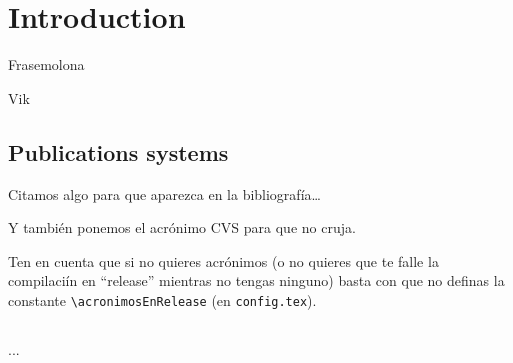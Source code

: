 %
%

\chapter{Introduction}

\begin{FraseCelebre}
\begin{Frase}
Frasemolona
\end{Frase}
\begin{Fuente}
Vik
\end{Fuente}
\end{FraseCelebre}


\section{Publications systems}
\label{cap1:sec:introduccion}

Citamos algo para que aparezca en la bibliografía\ldots

\medskip

Y también ponemos el acrónimo \ac{CVS} para que no cruja.

Ten en cuenta que si no quieres acrónimos (o no quieres que te falle la compilaciín en ``release'' mientras no tengas ninguno) basta con que no definas la constante \verb+\acronimosEnRelease+ (en \texttt{config.tex}).

\section*{\ProximoCapitulo}
\TocProximoCapitulo

...


